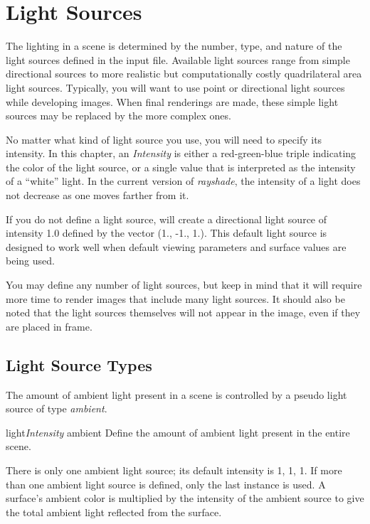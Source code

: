 \chapter{Light Sources}

The lighting in a scene is determined by the number, type, and nature
of the light sources defined in the input file.  Available light sources
range from simple directional sources to more realistic but computationally
costly quadrilateral area light sources.  Typically, you will want to use
point or directional light sources while developing images.  When
final renderings are made, these simple light sources may be replaced by
the more complex ones.

No matter what kind of light source you use, you will need to
specify its intensity.
In this chapter, an {\em Intensity\/} is either a red-green-blue triple
indicating the color of the light source, or a single value that is
interpreted as the intensity of a ``white'' light.
In the current version of {\em rayshade}, the intensity of a light does
not decrease as
one moves farther from it.

If you do not define a light source, \rayshade will create a directional
light source of intensity 1.0 defined by the vector (1., -1., 1.).
This default light source is designed to work well when default
viewing parameters and surface values are being used.

You may define any number of light sources, but keep in mind that
it will require more time to render images that include many
light sources.  It should also be noted that the light sources themselves
will not appear in the image, even if they are placed in frame.

\section{Light Source Types}

The amount of ambient light present in a scene is controlled by a
pseudo light source of type {\em ambient}.

\begin{defkey}{light}{{\em Intensity\/} ambient}
	Define the amount of ambient light present in the entire
	scene.
\end{defkey}

There is only one ambient light source; its default intensity is
{1, 1, 1}.  If more than one ambient light source is defined,
only the last instance is used.  A surface's ambient color
is multiplied by the intensity of the ambient source to give the
total ambient light reflected from the surface.

